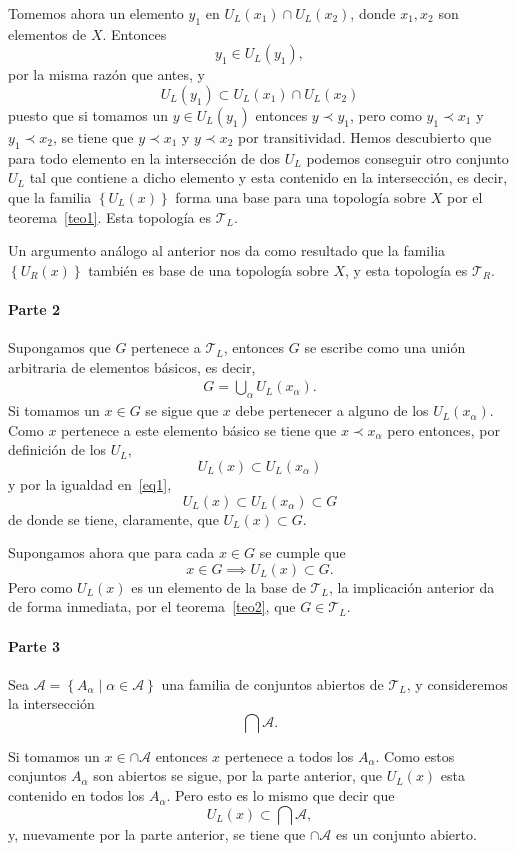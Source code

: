 \documentclass[fleqn,leqno,10pt,letterpaper,draft]{article}
\begin{document}
Tomemos ahora un elemento $y_1$ en $U_L(x_1)\cap U_L(x_2)$, donde
$x_1,x_2$ son elementos de $X$. Entonces
\[
	y_1\in U_L(y_1),
\]
por la misma razón que antes, y
\[
	U_L(y_1)\subset U_L(x_1)\cap U_L(x_2)
\]
puesto que si tomamos un $y\in U_L(y_1)$ entonces $y\prec y_1$, pero como
$y_1\prec x_1$ y $y_1\prec x_2$, se tiene que $y\prec x_1$ y $y\prec x_2$ por
transitividad. Hemos descubierto que para todo elemento en la intersección de dos $U_L$
podemos conseguir otro conjunto $U_L$ tal que contiene a dicho elemento y esta contenido en la
intersección, es decir, que la familia $\left\{ U_L(x) \right\}$ forma una base para una topología
sobre $X$ por el teorema~\ref{teo1}. Esta topología es $\mathcal{T}_L$.

Un argumento análogo al anterior nos da como resultado que la familia $\left\{ U_R(x) \right\}$ también es
base de una topología sobre $X$, y esta topología es $\mathcal{T}_R$.

\paragraph{Parte 2}
Supongamos que $G$ pertenece a $\mathcal{T}_L$, entonces $G$ se escribe como una unión arbitraria
de elementos básicos, es decir, 
\begin{align}
	G = \bigcup_\alpha U_L(x_\alpha).\label{eq1}
\end{align}
Si tomamos un $x\in G$ se sigue que $x$ debe pertenecer a alguno de los $U_L(x_\alpha)$. Como $x$ pertenece
a este elemento básico se tiene que $x\prec x_\alpha$ pero entonces, por definición de los $U_L$,
\[
	U_L(x)\subset U_L(x_\alpha)
\]
y por la igualdad en~\ref{eq1},
\[
	U_L(x)\subset U_L(x_\alpha)\subset G
\]
de donde se tiene, claramente, que $U_L(x)\subset G$.

Supongamos ahora que para cada $x\in G$ se cumple que
\[
	x\in G\implies U_L(x)\subset G.
\]
Pero como $U_L(x)$ es un elemento de la base de $\mathcal{T}_L$, la implicación anterior
da de forma inmediata, por el teorema~\ref{teo2}, que $G\in\mathcal{T}_L$.

\paragraph{Parte 3}%

Sea $\mathcal{A}=\left\{ A_\alpha\mid\alpha\in\mathscr{A} \right\}$ una familia de conjuntos abiertos
de $\mathcal{T}_L$, y consideremos la intersección
\[
	\bigcap\mathcal{A}.
\]

Si tomamos un $x\in\cap\mathcal{A}$ entonces $x$ pertenece a todos los $A_\alpha$. Como estos conjuntos
$A_\alpha$ son abiertos se sigue, por la parte anterior, que $U_L(x)$ esta contenido en todos
los $A_\alpha$. Pero esto es lo mismo que decir que
\[
	U_L(x)\subset\bigcap\mathcal{A},
\]
y, nuevamente por la parte anterior, se tiene que $\cap\mathcal{A}$ es un conjunto abierto. 
\end{document}
